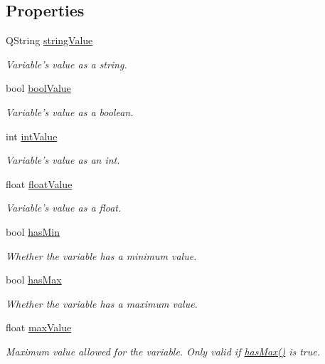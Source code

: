 \subsection*{Properties}
\begin{DoxyCompactItemize}
\item 
Q\-String \hyperlink{class_con_var_aa4e598b04548ba7f296a2fbe77e13e4d}{string\-Value}
\begin{DoxyCompactList}\small\item\em Variable's value as a string. \end{DoxyCompactList}\item 
bool \hyperlink{class_con_var_a9c926cb65abe64fc9da4eb22d128d635}{bool\-Value}
\begin{DoxyCompactList}\small\item\em Variable's value as a boolean. \end{DoxyCompactList}\item 
int \hyperlink{class_con_var_a41c1d7b9907c288d9a3fd27208c14905}{int\-Value}
\begin{DoxyCompactList}\small\item\em Variable's value as an int. \end{DoxyCompactList}\item 
float \hyperlink{class_con_var_a5f274e561a3ee35dd2d67341be4def6f}{float\-Value}
\begin{DoxyCompactList}\small\item\em Variable's value as a float. \end{DoxyCompactList}\item 
bool \hyperlink{class_con_var_a047d4105baf54cb783602456e0947196}{has\-Min}
\begin{DoxyCompactList}\small\item\em Whether the variable has a minimum value. \end{DoxyCompactList}\item 
bool \hyperlink{class_con_var_ab8a0883ab2a53b5ef20ea5673636ac01}{has\-Max}
\begin{DoxyCompactList}\small\item\em Whether the variable has a maximum value. \end{DoxyCompactList}\item 
float \hyperlink{class_con_var_a1c7d02c351c6fe7e9eae58fa65ef0ae4}{max\-Value}
\begin{DoxyCompactList}\small\item\em Maximum value allowed for the variable. Only valid if \hyperlink{class_con_var_ab8a0883ab2a53b5ef20ea5673636ac01}{has\-Max()} is true. \end{DoxyCompactList}\item 

\end{DoxyCompactItemize}
